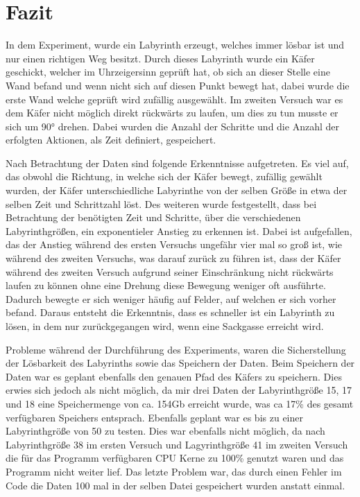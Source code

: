 \documentclass[12pt, a4paper, titlepage]{article}
\begin{document}
\section{Fazit}

In dem Experiment, wurde ein Labyrinth erzeugt, welches immer lösbar ist und nur einen richtigen Weg besitzt.
Durch dieses Labyrinth wurde ein Käfer geschickt, welcher im Uhrzeigersinn geprüft hat, ob sich an dieser Stelle eine Wand befand und wenn nicht sich auf diesen Punkt bewegt hat, dabei wurde die erste Wand welche geprüft wird zufällig ausgewählt.
Im zweiten Versuch war es dem Käfer nicht möglich direkt rückwärts zu laufen, um dies zu tun musste er sich um 90° drehen.
Dabei wurden die Anzahl der Schritte und die Anzahl der erfolgten Aktionen, als Zeit definiert, gespeichert.


\bigskip

Nach Betrachtung der Daten sind folgende Erkenntnisse aufgetreten.
Es viel auf, das obwohl die Richtung, in welche sich der Käfer bewegt, zufällig gewählt wurden, der Käfer unterschiedliche Labyrinthe von der selben Größe in etwa der selben Zeit und Schrittzahl löst.
Des weiteren wurde festgestellt, dass bei Betrachtung der benötigten Zeit und Schritte, über die verschiedenen Labyrinthgrößen, ein exponentieler Anstieg zu erkennen ist.
Dabei ist aufgefallen, das der Anstieg während des ersten Versuchs ungefähr vier mal so groß ist, wie während des zweiten Versuchs, was darauf zurück zu führen ist, dass der Käfer während des zweiten Versuch aufgrund seiner Einschränkung nicht rückwärts laufen zu können ohne eine Drehung diese Bewegung weniger oft ausführte.
Dadurch bewegte er sich weniger häufig auf Felder, auf welchen er sich vorher befand.
Daraus entsteht die Erkenntnis, dass es schneller ist ein Labyrinth zu lösen, in dem nur zurückgegangen wird, wenn eine Sackgasse erreicht wird.

\bigskip

Probleme während der Durchführung des Experiments, waren die Sicherstellung der Lösbarkeit des Labyrinths sowie das Speichern der Daten.
Beim Speichern der Daten war es geplant ebenfalls den genauen Pfad des Käfers zu speichern.
Dies erwies sich jedoch als nicht möglich, da mir drei Daten der Labyrinthgröße 15, 17 und 18 eine Speichermenge von ca. 154Gb erreicht wurde, was ca 17\% des gesamt verfügbaren Speichers entsprach.
Ebenfalls geplant war es bis zu einer Labyrinthgröße von 50 zu testen.
Dies war ebenfalls nicht möglich, da nach Labyrinthgröße 38 im ersten Versuch und Lagyrinthgröße 41 im zweiten Versuch die für das Programm verfügbaren CPU Kerne zu 100\% genutzt waren und das Programm nicht weiter lief.
Das letzte Problem war, das durch einen Fehler im Code die Daten 100 mal in der selben Datei gespeichert wurden anstatt einmal.

\newpage

\printbibliography 
\end{document}
